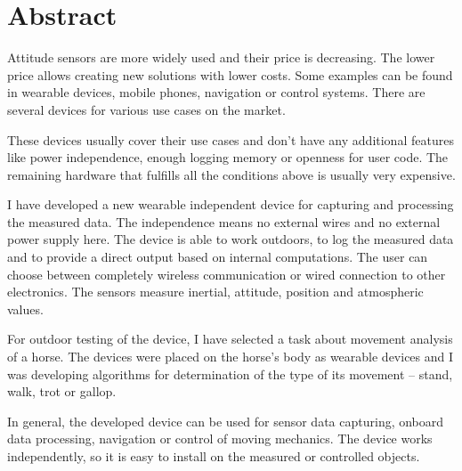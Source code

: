 
\chapter{Abstract}
Attitude sensors are more widely used and their price is decreasing. The lower price allows creating new solutions with lower costs. Some examples can be found in wearable devices, mobile phones, navigation or control systems. There are several devices for various use cases on the market.

These devices usually cover their use cases and don't have any additional features like power independence, enough logging memory or openness for user code. The remaining hardware that fulfills all the conditions above is usually very expensive.

I have developed a new wearable independent device for capturing and processing the measured data. The independence means no external wires and no external power supply here. The device is able to work outdoors, to log the measured data and to provide a direct output based on internal computations. The user can choose between completely wireless communication or wired connection to other electronics. The sensors measure inertial, attitude, position and atmospheric values.

For outdoor testing of the device, I have selected a task about movement analysis of a horse. The devices were placed on the horse's body as wearable devices and I was developing algorithms for determination of the type of its movement -- stand, walk, trot or gallop.

In general, the developed device can be used for sensor data capturing, onboard data processing, navigation or control of moving mechanics. The device works independently, so it is easy to install on the measured or controlled objects.
